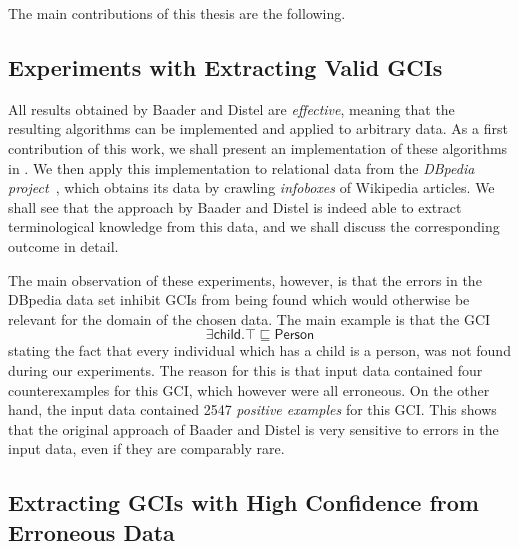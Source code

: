 The main contributions of this thesis are the following.

\subsection{Experiments with Extracting Valid GCIs}
\label{sec:exper-with-extr}

All results obtained by Baader and Distel are \emph{effective}, meaning that the resulting
algorithms can be implemented and applied to arbitrary data.  As a first contribution of
this work, we shall present an implementation of these algorithms in
.  We then apply this implementation to relational data
from the \emph{DBpedia project}~\cite{DBpedia}, which obtains its data by crawling
\emph{infoboxes} of Wikipedia articles.  We shall see that the approach by Baader and
Distel is indeed able to extract terminological knowledge from this data, and we shall
discuss the corresponding outcome in detail.

The main observation of these experiments, however, is that the errors in the DBpedia data
set inhibit GCIs from being found which would otherwise be relevant for the domain of the
chosen data.  The main example is that the GCI
\begin{equation*}
  \exists \mathsf{child}. \top \sqsubseteq \mathsf{Person}
\end{equation*}
stating the fact that every individual which has a child is a person, was not found during
our experiments.  The reason for this is that input data contained four counterexamples
for this GCI, which however were all erroneous.  On the other hand, the input data
contained 2547 \emph{positive examples} for this GCI.  This shows that the original
approach of Baader and Distel is very sensitive to errors in the input data, even if they
are comparably rare.

\subsection{Extracting GCIs with High Confidence from Erroneous Data}
\label{sec:extracting-gcis-from}

